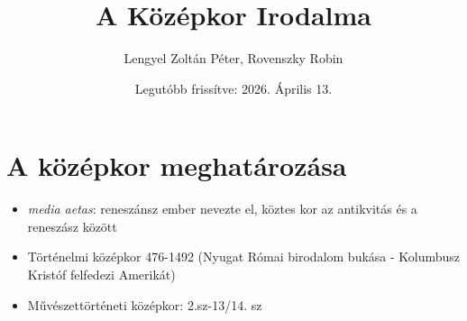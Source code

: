\documentclass{article}
\title{A Középkor Irodalma}
\author{Lengyel Zoltán Péter, Rovenszky Robin}
\date{Legutóbb frissítve: 2026. Április 13.}
\begin{document}
\maketitle
\tableofcontents
\newpage

\section{A középkor meghatározása}

\begin{itemize}
    \item \emph{media aetas}: reneszánsz ember nevezte el, köztes kor az antikvitás és a reneszász között
    \item Történelmi középkor 476-1492 (Nyugat Római birodalom bukása - Kolumbusz Kristóf felfedezi Amerikát)
    \item Művészettörténeti középkor: 2.sz-13/14. sz
\end{itemize}
\end{document}
